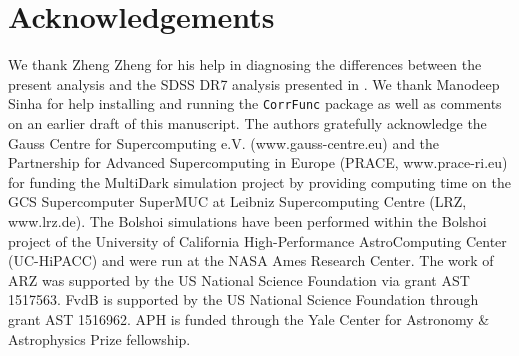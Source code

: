 \documentclass[usenatbib,usegraphicx,letterpaper]{mn2e}
\begin{document}
\section{Acknowledgements}
\label{section:acknowledgements}

We thank Zheng Zheng for his help in diagnosing the
differences between the present analysis and the SDSS DR7
analysis presented in \citet{zehavi_etal11}. We thank Manodeep 
Sinha for help installing and running the {\tt CorrFunc} package 
as well as comments on an earlier draft of this manuscript.
The authors gratefully acknowledge the Gauss Centre for Supercomputing
e.V. (www.gauss-centre.eu) and the Partnership for Advanced
Supercomputing in Europe (PRACE, www.prace-ri.eu) for funding the
MultiDark simulation project by providing computing time on the GCS
Supercomputer SuperMUC at Leibniz Supercomputing Centre (LRZ,
www.lrz.de). The Bolshoi simulations have been performed within the
Bolshoi project of the University of California High-Performance
AstroComputing Center (UC-HiPACC) and were run at the NASA Ames
Research Center. The work of ARZ was supported by the US National Science
Foundation via grant AST 1517563. FvdB is supported by the US National Science
Foundation through grant AST 1516962. APH is funded through the Yale Center 
for Astronomy \& Astrophysics Prize fellowship.




\end{document}
